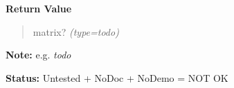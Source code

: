 \begin{boxedminipage}{\funcwidth}
\begin{quote}
      \end{quote}

      \textbf{Return Value}
    \vspace{-1ex}

      \begin{quote}

matrix?
      {\it (type=\emph{todo})}

      \end{quote}

\textbf{Note:} 
e.g. \emph{todo}


\textbf{Status:} 
Untested + NoDoc + NoDemo = NOT OK


    \end{boxedminipage}

    \label{xformslib:flflimage:fl_j2pass_quantize_packed}

    \vspace{0.5ex}

